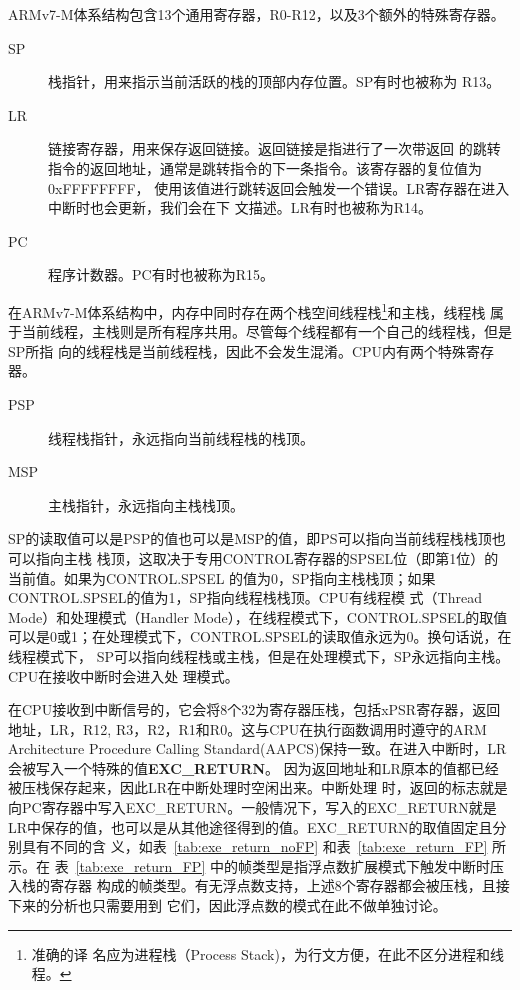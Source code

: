 ARMv7-M体系结构包含13个通用寄存器，R0-R12，以及3个额外的特殊寄存器。

\begin{description}
	\item[SP] 栈指针，用来指示当前活跃的栈的顶部内存位置。SP有时也被称为
	R13。
	\item[LR] 链接寄存器，用来保存返回链接。返回链接是指进行了一次带返回
	的跳转指令的返回地址，通常是跳转指令的下一条指令。该寄存器的复位值为0xFFFFFFFF，
	使用该值进行跳转返回会触发一个错误。LR寄存器在进入中断时也会更新，我们会在下
	文描述。LR有时也被称为R14。
	\item[PC] 程序计数器。PC有时也被称为R15。
\end{description}

在ARMv7-M体系结构中，内存中同时存在两个栈空间\pozhehao 线程栈\footnote{准确的译
名应为进程栈（Process Stack)，为行文方便，在此不区分进程和线程。}和主栈，线程栈
属于当前线程，主栈则是所有程序共用。尽管每个线程都有一个自己的线程栈，但是SP所指
向的线程栈是当前线程栈，因此不会发生混淆。CPU内有两个特殊寄存器。

\begin{description}
	\item[PSP] 线程栈指针，永远指向当前线程栈的栈顶。
	\item[MSP] 主栈指针，永远指向主栈栈顶。
\end{description}

SP的读取值可以是PSP的值也可以是MSP的值，即PS可以指向当前线程栈栈顶也可以指向主栈
栈顶，这取决于专用CONTROL寄存器的SPSEL位（即第1位）的当前值。如果为CONTROL.SPSEL
的值为0，SP指向主栈栈顶；如果CONTROL.SPSEL的值为1，SP指向线程栈栈顶。CPU有线程模
式（Thread Mode）和处理模式（Handler Mode），在线程模式下，CONTROL.SPSEL的取值
可以是0或1；在处理模式下，CONTROL.SPSEL的读取值永远为0。换句话说，在线程模式下，
SP可以指向线程栈或主栈，但是在处理模式下，SP永远指向主栈。CPU在接收中断时会进入处
理模式。

在CPU接收到中断信号的，它会将8个32为寄存器压栈，包括xPSR寄存器，返回地址，LR，R12,
R3，R2，R1和R0。这与CPU在执行函数调用时遵守的ARM Architecture Procedure Calling
Standard(AAPCS)保持一致。在进入中断时，LR会被写入一个特殊的值\textbf{EXC\_RETURN}。
因为返回地址和LR原本的值都已经被压栈保存起来，因此LR在中断处理时空闲出来。中断处理
时，返回的标志就是向PC寄存器中写入EXC\_RETURN。一般情况下，写入的EXC\_RETURN就是
LR中保存的值，也可以是从其他途径得到的值。EXC\_RETURN的取值固定且分别具有不同的含
义，如表~\ref{tab:exe_return_noFP} 和表~\ref{tab:exe_return_FP} 所示。在
表~\ref{tab:exe_return_FP} 中的帧类型是指浮点数扩展模式下触发中断时压入栈的寄存器
构成的帧类型。有无浮点数支持，上述8个寄存器都会被压栈，且接下来的分析也只需要用到
它们，因此浮点数的模式在此不做单独讨论。\cite{ARM} 

